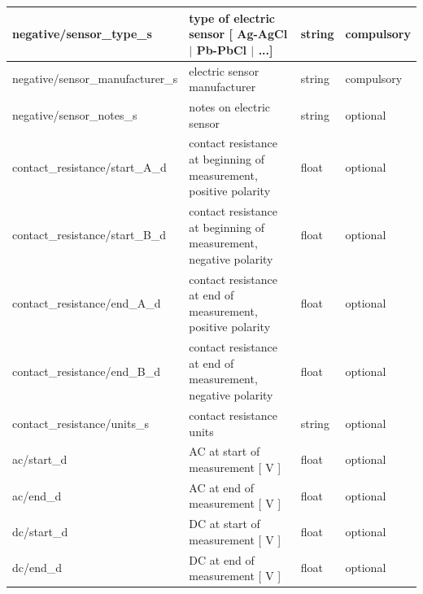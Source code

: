 \documentclass{article}
\begin{document}
\begin{table}[htb!]
\begin{tabular}{|l|p{3in}|l|l|}
		negative/sensor\_type\_s & type of electric sensor [ Ag-AgCl $|$ Pb-PbCl $|$ ...] & string & compulsory \\ \hline
		negative/sensor\_manufacturer\_s & electric sensor manufacturer & string & compulsory \\ \hline
		negative/sensor\_notes\_s & notes on electric sensor & string & optional \\ \hline
		contact\_resistance/start\_A\_d & contact resistance at beginning of measurement, positive polarity & float & optional \\ \hline
		contact\_resistance/start\_B\_d & contact resistance at beginning of measurement, negative polarity & float & optional \\ \hline
		contact\_resistance/end\_A\_d & contact resistance at end of measurement, positive polarity & float & optional \\ \hline
		contact\_resistance/end\_B\_d & contact resistance at end of measurement, negative polarity & float & optional \\ \hline
		contact\_resistance/units\_s & contact resistance units & string & optional \\ \hline
		ac/start\_d & AC at start of measurement [ V ] & float & optional \\ \hline
		ac/end\_d & AC at end of measurement [ V ] & float & optional \\ \hline
		dc/start\_d & DC at start of measurement [ V ] & float & optional \\ \hline
		dc/end\_d & DC at end of measurement [ V ] & float & optional \\ \hline
		
	\end{tabular}
	\label{tab:electric01}
\end{table}	
\end{document}
